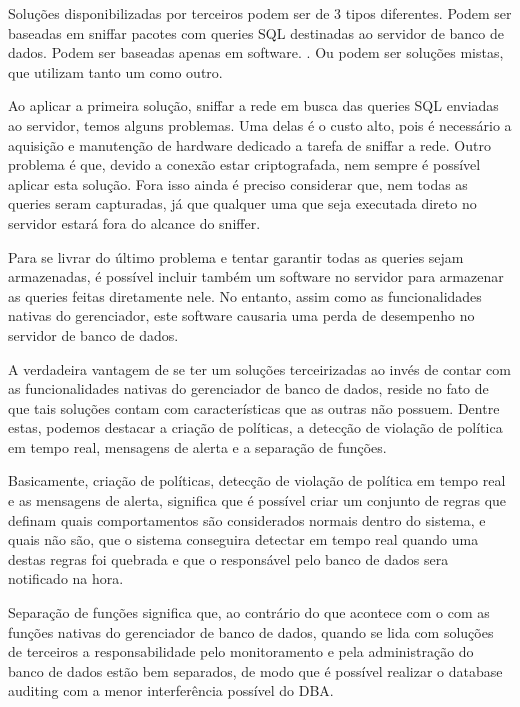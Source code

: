 ﻿\documentclass{article}
\begin{document}
Soluções disponibilizadas por terceiros podem ser de 3 tipos diferentes. Podem ser baseadas em sniffar pacotes com queries SQL destinadas ao servidor de banco de dados. Podem ser baseadas apenas em software. . Ou podem ser soluções mistas, que utilizam tanto um como outro.

Ao aplicar a primeira solução, sniffar a rede em busca das queries SQL enviadas ao servidor, temos alguns problemas. Uma delas é o custo alto, pois é necessário a aquisição e manutenção de hardware dedicado a tarefa de sniffar a rede. Outro problema é que, devido a conexão estar criptografada, nem sempre é possível aplicar esta solução. Fora isso ainda é preciso considerar que, nem todas as queries seram capturadas, já que qualquer  uma que seja executada direto no servidor estará fora do alcance do sniffer.

Para se livrar do último problema e tentar garantir todas as queries sejam armazenadas, é possível incluir também um software no servidor para armazenar as queries feitas diretamente nele. No entanto, assim como as funcionalidades nativas do gerenciador, este software causaria uma perda de desempenho no servidor de banco de dados. 

A verdadeira vantagem de se ter um soluções terceirizadas ao invés de contar com as funcionalidades nativas do gerenciador de banco de dados, reside no fato de que tais soluções contam com características que as outras não possuem. Dentre estas, podemos destacar a criação de políticas, a detecção de violação de política em tempo real, mensagens de alerta e a separação de funções.

Basicamente, criação de políticas, detecção de violação de política em tempo real e as mensagens de alerta, significa que é possível criar um conjunto de regras que definam quais comportamentos são considerados normais dentro do sistema, e quais não são, que o sistema conseguira detectar em tempo real quando uma destas regras foi quebrada e que o responsável pelo banco de dados sera notificado na hora.

Separação de funções significa que, ao contrário do que acontece com o com as funções nativas do gerenciador de banco de dados, quando se lida com soluções de terceiros a responsabilidade pelo monitoramento e pela administração do banco de dados estão bem separados, de modo que é possível realizar o database auditing com a menor interferência possível do DBA.
\end{document}
